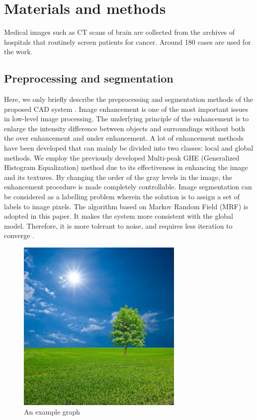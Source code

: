 \chapter{Materials and methods}
Medical images such as CT scans of brain are collected from the archives of hospitals that routinely screen patients for cancer. Around 180 cases are used for the work.
\section{Preprocessing and segmentation}

Here, we only briefly describe the preprocessing and segmentation methods of the proposed CAD system \cite{einstein}. Image enhancement is one of the most important issues in low-level image processing. The underlying principle of the enhancement is to enlarge the intensity difference between objects and surroundings without both the over enhancement and under enhancement. A lot of enhancement methods have been developed that can mainly be divided into two classes: local and global methods. We employ the previously developed Multi-peak GHE (Generalized Histogram Equalization) method due to its effectiveness in enhancing the image and its textures. By changing the order of the gray levels in the image, the enhancement procedure is made completely controllable. Image segmentation can be considered as a labelling problem wherein the solution is to assign a set of labels to image pixels. The algorithm based on Markov Random Field (MRF) is adopted in this paper. It makes the system more consistent with the global model. Therefore, it is more tolerant to noise, and requires less iteration to converge \cite{latexcompanion}.

\begin{figure}[h]
\centering
\includegraphics[width=8cm]{chapters/1.jpg}
\caption{An example graph}
\label{graph}
\end{figure}





